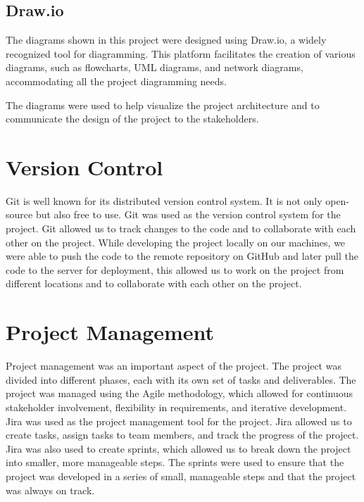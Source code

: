 \subsection{Draw.io}

The diagrams shown in this project were designed using Draw.io, a widely recognized tool for diagramming. This platform facilitates the creation of various 
diagrams, such as flowcharts, UML diagrams, and network diagrams, accommodating all the project diagramming needs.

The diagrams were used to help visualize the project architecture and to communicate the design of the
project to the stakeholders.

\section{Version Control}

Git is well known for its distributed version control system. It is not only open-source but also free to use.
Git was used as the version control system for the project. Git allowed us to track changes to the code and to collaborate with each other on the project.
While developing the project locally on our machines, we were able to push the code to the remote repository on GitHub and later pull the code to the server
for deployment, this allowed us to work on the project from different locations and to collaborate with each other on the project.

\section{Project Management}

Project management was an important aspect of the project. The project was divided into different phases, each with its own set of tasks and deliverables.
The project was managed using the Agile methodology, which allowed for continuous stakeholder involvement, flexibility in requirements, and iterative development.
Jira was used as the project management tool for the project. Jira allowed us to create tasks, assign tasks to team members, and track the progress of the project.
Jira was also used to create sprints, which allowed us to break down the project into smaller, more manageable steps. The sprints were used to ensure that the project was
developed in a series of small, manageable steps and that the project was always on track.

